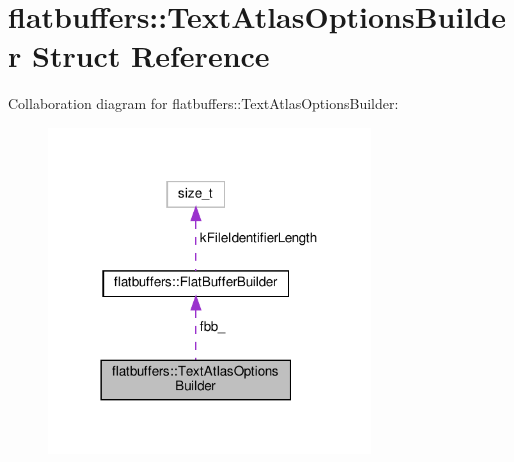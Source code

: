\hypertarget{structflatbuffers_1_1TextAtlasOptionsBuilder}{}\section{flatbuffers\+:\+:Text\+Atlas\+Options\+Builder Struct Reference}
\label{structflatbuffers_1_1TextAtlasOptionsBuilder}


Collaboration diagram for flatbuffers\+:\+:Text\+Atlas\+Options\+Builder\+:
\nopagebreak
\begin{figure}[H]
\begin{center}
\leavevmode
\includegraphics[width=242pt]{structflatbuffers_1_1TextAtlasOptionsBuilder__coll__graph}
\end{center}
\end{figure}
